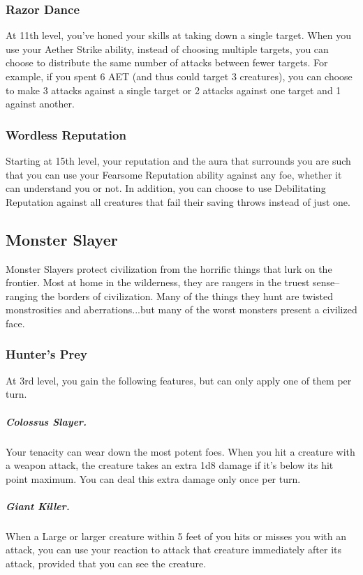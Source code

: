 \subsubsection{Razor Dance}
At 11th level, you've honed your skills at taking down a single target. When you use your Aether Strike ability, instead of choosing multiple targets, you can choose to distribute the same number of attacks between fewer targets. For example, if you spent 6 AET (and thus could target 3 creatures), you can choose to make 3 attacks against a single target or 2 attacks against one target and 1 against another.

\subsubsection{Wordless Reputation}
Starting at 15th level, your reputation and the aura that surrounds you are such that you can use your Fearsome Reputation ability against any foe, whether it can understand you or not. In addition, you can choose to use Debilitating Reputation against all creatures that fail their saving throws instead of just one.

\subsection{Monster Slayer}
Monster Slayers protect civilization from the horrific things that lurk on the frontier. Most at home in the wilderness, they are rangers in the truest sense--ranging the borders of civilization. Many of the things they hunt are twisted monstrosities and aberrations...but many of the worst monsters present a civilized face. 

\subsubsection{Hunter's Prey}

At 3rd level, you gain the following features, but can only apply one of them per turn.

\subparagraph*{Colossus Slayer.} Your tenacity can wear down the most potent foes. When you hit a creature with a weapon attack, the creature takes an extra 1d8 damage if it's below its hit point maximum. You can deal this extra damage only once per turn.

\subparagraph*{Giant Killer.} When a Large or larger creature within 5 feet of you hits or misses you with an attack, you can use your reaction to attack that creature immediately after its attack, provided that you can see the creature.

